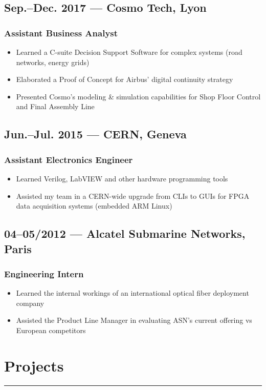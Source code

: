 \documentclass[10pt]{article}
\begin{document}
\subsection*{Sep.--Dec. 2017 --- Cosmo Tech, Lyon}
\subsubsection*{Assistant Business Analyst}
\begin{itemize}
    \item Learned a C-suite Decision Support Software for complex systems (road networks, energy grids)
    \item Elaborated a Proof of Concept for Airbus’ digital continuity strategy
    \item Presented Cosmo’s modeling \& simulation capabilities for Shop Floor Control and Final Assembly Line
\end{itemize}
\subsection*{Jun.--Jul. 2015 --- CERN, Geneva}
\subsubsection*{Assistant Electronics Engineer}
\begin{itemize}
    \item Learned Verilog, LabVIEW and other hardware programming tools
    \item Assisted my team in a CERN-wide upgrade from CLIs to GUIs for FPGA data acquisition systems (embedded ARM Linux)
\end{itemize}
\subsection*{04--05/2012 --- Alcatel Submarine Networks, Paris}
\subsubsection*{Engineering Intern}
\begin{itemize}
    \item Learned the internal workings of an international optical fiber deployment company
    \item Assisted the Product Line Manager in evaluating ASN's current offering vs European competitors
\end{itemize}

\section*{Projects}
\rule{\linewidth}{1pt}\\
\end{document}
